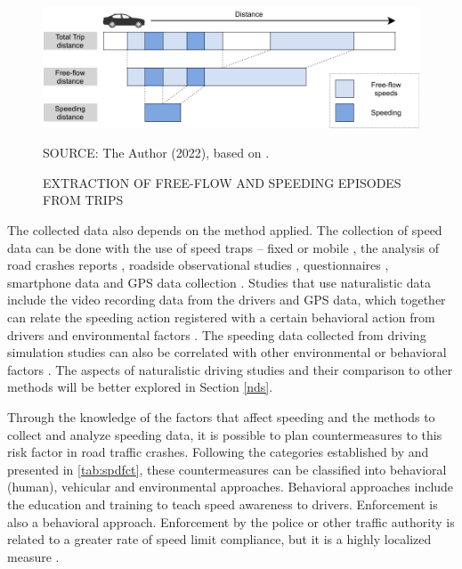 \begin{figure}[!htbp]
    \centering\footnotesize
    \captionsetup{font=footnotesize}
    \caption{EXTRACTION OF FREE-FLOW AND SPEEDING EPISODES FROM TRIPS}
    \includegraphics{fig/richards.pdf}
    \label{fig:ff}
    \par SOURCE: The Author (2022), based on \textcite{Richard2013}.
\end{figure}

The collected data also depends on the method applied. The collection of speed data can be done with the use of speed traps – fixed or mobile \cite{Hidalgo-Solorzano2020, WHO2008}, the analysis of road crashes reports \cite{Watson2015}, roadside observational studies \cite{Shinar2017}, questionnaires \cite{Dinh2013}, smartphone data \cite{Warren2019} and GPS data collection \cite{Moreno2013, Wang2018}. Studies that use naturalistic data include the video recording data from the drivers and GPS data, which together can relate the speeding action registered with a certain behavioral action from drivers \cite{Bastos2020a} and environmental factors \cite{Moreno2013}. The speeding data collected from driving simulation studies can also be correlated with other environmental or behavioral factors \cite{Yadav2020}. The aspects of naturalistic driving studies and their comparison to other methods will be better explored in Section \ref{nds}. 

Through the knowledge of the factors that affect speeding and the methods to collect and analyze speeding data, it is possible to plan countermeasures to this risk factor in road traffic crashes. Following the categories established by \textcite{Haddon1980} and presented in \autoref{tab:spdfct}, these countermeasures can be classified into behavioral (human), vehicular and environmental approaches. Behavioral approaches include the education and training to teach speed awareness to drivers. Enforcement is also a behavioral approach. Enforcement by the police or other traffic authority is related to a greater rate of speed limit compliance, but it is a highly localized measure \cite{Shinar2017}. 

